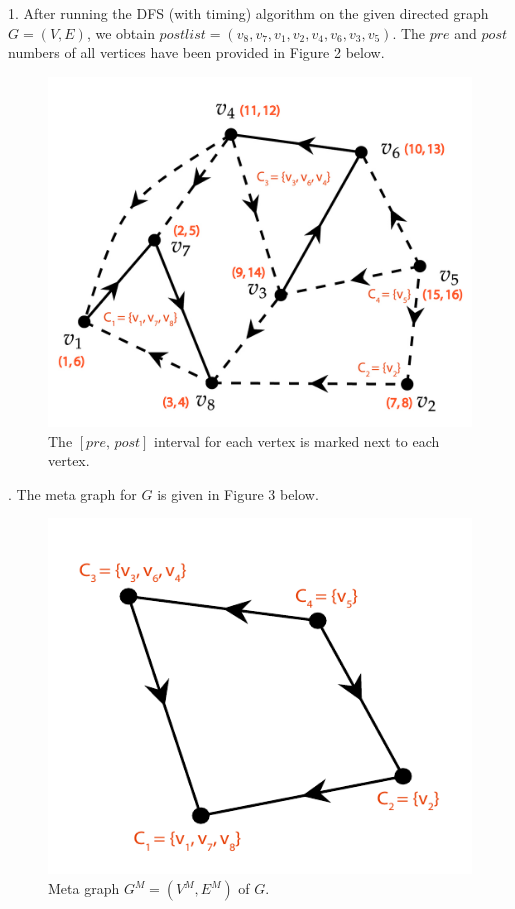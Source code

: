 \documentclass[tikz, letterpaper,12pt]{article}
\begin{document}
1. After running the DFS (with timing) algorithm on the given directed graph $G=(V,E)$, we obtain $postlist = (v_8,v_7,v_1,v_2,v_4,v_6,v_3,v_5)$. The $pre$ and $post$ numbers of all vertices have been provided in Figure 2 below.
\begin{figure}[H]
\centering
    \includegraphics[scale=1.55]{WA2/images/dfs.jpg}
    \caption{The $[pre,\,post]$ interval for each vertex is marked next to each vertex.}
\end{figure}
. The meta graph for $G$ is given in Figure 3 below.
\begin{figure}[H]
\centering
    \includegraphics[scale=1.3]{WA2/images/meta.pdf}
    \caption{Meta graph $G^M=(V^M,E^M)$ of $G$.}
\end{figure}
\end{document}
